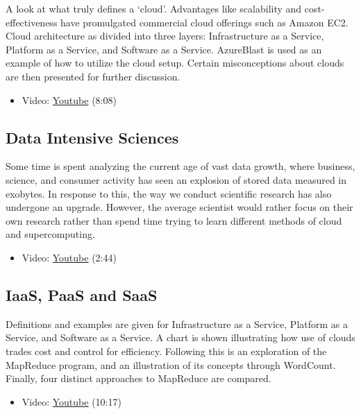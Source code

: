 A look at what truly defines a `cloud'. Advantages like scalability and
cost-effectiveness have promulgated commercial cloud offerings such as
Amazon EC2. Cloud architecture as divided into three layers:
Infrastructure as a Service, Platform as a Service, and Software as a
Service. AzureBlast is used as an example of how to utilize the cloud
setup. Certain misconceptions about clouds are then presented for
further discussion.

\begin{itemize}
\tightlist
\item
  Video: \href{https://www.youtube.com/watch?v=6Hq_LuLB-RU}{Youtube}
  (8:08)
\end{itemize}

\subsection{Data Intensive Sciences}\label{data-intensive-sciences}

Some time is spent analyzing the current age of vast data growth, where
business, science, and consumer activity has seen an explosion of stored
data measured in exobytes. In response to this, the way we conduct
scientific research has also undergone an upgrade. However, the average
scientist would rather focus on their own research rather than spend
time trying to learn different methods of cloud and supercomputing.

\begin{itemize}
\tightlist
\item
  Video: \href{https://www.youtube.com/watch?v=Ptoj3BME_z4}{Youtube}
  (2:44)
\end{itemize}

\subsection{IaaS, PaaS and SaaS}\label{iaas-paas-and-saas}

Definitions and examples are given for Infrastructure as a Service,
Platform as a Service, and Software as a Service. A chart is shown
illustrating how use of clouds trades cost and control for efficiency.
Following this is an exploration of the MapReduce program, and an
illustration of its concepts through WordCount. Finally, four distinct
approaches to MapReduce are compared.

\begin{itemize}
\tightlist
\item
  Video: \href{https://www.youtube.com/watch?v=_irz3v1gT-A}{Youtube}
  (10:17)
\end{itemize}

